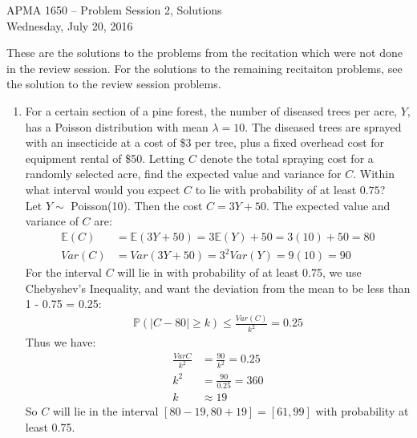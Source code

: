 \documentclass[12pt]{article}
\def\P{{\mathbb P}}
\def\E{{\mathbb E}}
\begin{document}
\title{}
\author{\vspace{-10ex} }

\begin{center}
{\LARGE APMA 1650 -- Problem Session 2, Solutions}\\
\vspace{5mm}
{\large Wednesday, July 20, 2016}\\
\end{center}

These are the solutions to the problems from the recitation which were not done in the review session. For the solutions to the remaining recitaiton problems, see the solution to the review session problems.

\begin{enumerate}

\item For a certain section of a pine forest, the number of diseased trees per acre, $Y$, has a Poisson distribution with mean $\lambda = 10$. The diseased trees are sprayed with an insecticide at a cost of \$3 per tree, plus a fixed overhead cost for equipment rental of \$50. Letting $C$ denote the total spraying cost for a randomly selected acre, find the expected value and variance for $C$. Within what interval would you expect $C$ to lie with probability of at least $0.75$?\\

Let $Y \sim$ Poisson(10). Then the cost $C = 3 Y + 50$. The expected value and variance of $C$ are:
\begin{align*}
\E(C) &= \E(3Y + 50) = 3 \E(Y) + 50 = 3(10) + 50 = 80 \\
Var(C) &= Var(3Y + 50) = 3^2 Var(Y) = 9(10) = 90
\end{align*}
For the interval $C$ will lie in with probability of at least 0.75, we use Chebyshev's Inequality, and want the deviation from the mean to be less than 1 - 0.75 = 0.25:
\begin{align*}
\P( |C - 80| \geq k ) \leq \frac{Var(C)}{k^2} = 0.25
\end{align*}
Thus we have:
\begin{align*}
\frac{Var{C}}{k^2} &= \frac{90}{k^2} = 0.25\\
k^2 &= \frac{90}{0.25} = 360\\
k &\approx 19
\end{align*}
So $C$ will lie in the interval $[80 - 19, 80 + 19] = [61, 99]$ with probability at least 0.75.


\end{enumerate}
\end{document}
